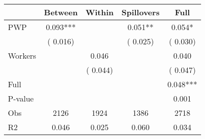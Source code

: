 
\begin{tabular}{l*{4}{c}}\hline&\multicolumn{1}{c}{Between}&\multicolumn{1}{c}{Within}&\multicolumn{1}{c}{Spillovers}&\multicolumn{1}{c}{Full}\\ \hline
 PWP           &              0.093***      &                                               &        0.051** &         0.054*                            \\ 
                               &        (       0.016)           &                                       &       (       0.025)     &      (       0.030)                                           \\ 
 Workers       &                                               &        0.046    &                                &             0.040                            \\ 
                               &                                               & (       0.044)                  &                                        &      (       0.047)                                           \\ 
\hline                                                                                                                                                                                                                                            
 Full                  &                                               &                                               &                                        &             0.048***                                     \\ 
 P-value               &                                               &                                               &                                        &             0.001                                           \\ 
 Obs                   &               2126               &       1924                       &       1386                &              2718                                               \\ 
 R2                    &                      0.046              &              0.025                      &              0.060               &                     0.034                                              \\ 
\hline \end{tabular}                                                                                                                                                                                                              